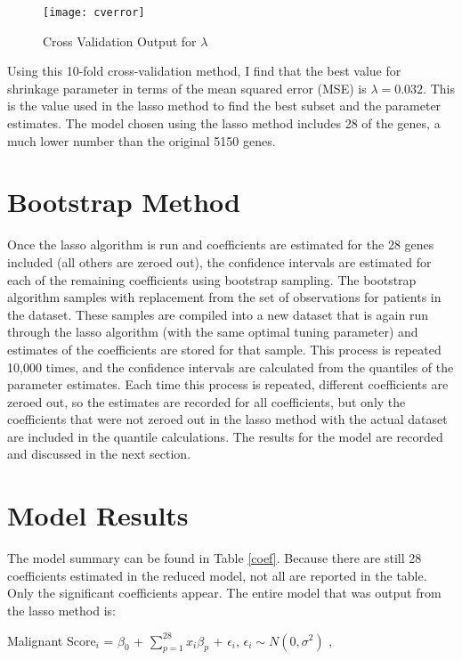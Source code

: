 \documentclass{svproc}
\begin{document}
\begin{figure}
\begin{center}
\caption{Cross Validation Output for $\lambda$}
\texttt{[image: cverror]}
\label{cvlambda}
\smallskip
\end{center}
\end{figure}

Using this 10-fold cross-validation method, I find that the best value for shrinkage parameter in terms of the mean squared error (MSE) is $\lambda = 0.032$. This is the value used in the lasso method to find the best subset and the parameter estimates. The model chosen using the lasso method includes 28 of the genes, a much lower number than the original 5150 genes.  

\section{Bootstrap Method}

Once the lasso algorithm is run and coefficients are estimated for the 28 genes included (all others are zeroed out), the confidence intervals are estimated for each of the remaining coefficients using bootstrap sampling. The bootstrap algorithm samples with replacement from the set of observations for patients in the dataset. These samples are compiled into a new dataset that is again run through the lasso algorithm (with the same optimal tuning parameter) and estimates of the coefficients are stored for that sample. This process is repeated 10,000 times, and the confidence intervals are calculated from the quantiles of the parameter estimates. Each time this process is repeated, different coefficients are zeroed out, so the estimates are recorded for all coefficients, but only the coefficients that were not zeroed out in the lasso method with the actual dataset are included in the quantile calculations. The results for the model are recorded and discussed in the next section.

\section{Model Results}

The model summary can be found in Table \ref{coef}. Because there are still 28 coefficients estimated in the reduced model, not all are reported in the table. Only the significant coefficients appear. The entire model that was output from the lasso method is: 


\begin{center}
Malignant Score$_i$ = $\beta_0$ + $\sum_{p=1}^{28} x_i \beta_p$ + $\epsilon_i$, ${ \epsilon_i} \sim N(0,\sigma^2)$ ,
\end{center}
\end{document}
